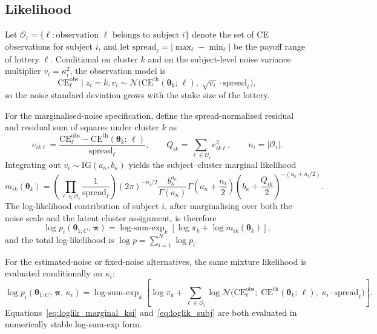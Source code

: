 \documentclass[12pt, a4paper]{article}
\newcommand{\Normal}{\mathcal{N}}
\newcommand{\IG}{\mathrm{IG}}
\newcommand{\logsumexp}{\operatorname{log\text{-}sum\text{-}exp}}
\newcommand{\btheta}{\bm{\theta}}
\newcommand{\bpi}{\bm{\pi}}
\newcommand{\ksi}{\kappa}
\begin{document}
\subsection{Likelihood}
\label{sec:likelihood}

Let $\mathcal{O}_i = \{\ell : \text{observation } \ell \text{ belongs to subject }i\}$
denote the set of CE observations for subject $i$, and let
$\mathrm{spread}_\ell = |\max_\ell - \min_\ell|$ be the payoff range of lottery $\ell$.
Conditional on cluster $k$ and on the subject-level noise variance multiplier
$v_i = \ksi_i^2$, the observation model is
\begin{equation}
  \mathrm{CE}^{\mathrm{obs}}_\ell \mid z_i=k, v_i
  \sim \Normal\!\bigl(\mathrm{CE}^{\mathrm{th}}(\btheta_k;\,\ell),\;
                      \sqrt{v_i} \cdot \mathrm{spread}_\ell\bigr),
  \label{eq:obs_model}
\end{equation}
so the noise standard deviation grows with the stake size of the lottery.

For the marginalised-noise specification, define the spread-normalised residual
and residual sum of squares under cluster $k$ as
\begin{equation}
  e_{ik\ell}
  =
  \frac{\mathrm{CE}^{\mathrm{obs}}_\ell
        - \mathrm{CE}^{\mathrm{th}}(\btheta_k;\,\ell)}
       {\mathrm{spread}_\ell},
  \qquad
  Q_{ik} = \sum_{\ell \in \mathcal{O}_i} e_{ik\ell}^2,
  \qquad
  n_i = |\mathcal{O}_i|.
  \label{eq:scaled_residuals}
\end{equation}
Integrating out $v_i \sim \IG(a_\ksi,b_\ksi)$ yields the subject--cluster
marginal likelihood
\begin{equation}
  m_{ik}(\btheta_k)
  =
  \left(\prod_{\ell \in \mathcal{O}_i}
        \frac{1}{\mathrm{spread}_\ell}\right)
  (2\pi)^{-n_i/2}
  \frac{b_\ksi^{a_\ksi}}{\Gamma(a_\ksi)}
  \Gamma\!\left(a_\ksi + \frac{n_i}{2}\right)
  \left(b_\ksi + \frac{Q_{ik}}{2}\right)^{-\left(a_\ksi+n_i/2\right)}.
  \label{eq:ksi_marginal_lik}
\end{equation}
The log-likelihood contribution of subject $i$, after marginalising over both
the noise scale and the latent cluster assignment, is therefore
\begin{equation}
  \log p_i(\btheta_{1:C},\, \bpi)
  =
  \logsumexp_k\!\left[
    \log \pi_k + \log m_{ik}(\btheta_k)
  \right],
  \label{eq:loglik_marginal_ksi}
\end{equation}
and the total log-likelihood is $\log p = \sum_{i=1}^{N} \log p_i$.

For the estimated-noise or fixed-noise alternatives, the same mixture
likelihood is evaluated conditionally on $\ksi_i$:
\begin{equation}
  \log p_i(\btheta_{1:C},\, \bpi,\, \ksi_i)
  =
  \logsumexp_{k}\!\left[
      \log \pi_k
    + \sum_{\ell \in \mathcal{O}_i}
        \log \Normal\!\bigl(\mathrm{CE}^{\mathrm{obs}}_\ell;\;
             \mathrm{CE}^{\mathrm{th}}(\btheta_k;\,\ell),\;
             \ksi_i \cdot \mathrm{spread}_\ell\bigr)
  \right].
  \label{eq:loglik_subj}
\end{equation}
Equations~\eqref{eq:loglik_marginal_ksi} and~\eqref{eq:loglik_subj} are both
evaluated in numerically stable log-sum-exp form.
\end{document}
